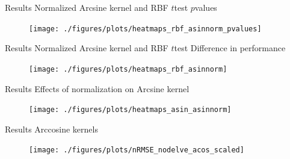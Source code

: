 \documentclass[aspectratio=169]{beamer}
\begin{document}
\begin{frame}{Results \textendash{} Normalized Arcsine kernel and RBF \textendash{} $t$\textendash{}test}
	\centering $p$\textendash{}values
	\begin{figure}[H]
		\texttt{[image: ./figures/plots/heatmaps\_rbf\_asinnorm\_pvalues]}
	\end{figure}
\end{frame}

\begin{frame}{Results \textendash{} Normalized Arcsine kernel and RBF \textendash{} $t$\textendash{}test}
	\centering Difference in performance
	\begin{figure}[H]
		\texttt{[image: ./figures/plots/heatmaps\_rbf\_asinnorm]}
	\end{figure}
\end{frame}


\begin{frame}{Results \textendash{} Effects of normalization on Arcsine kernel}
	\begin{figure}[H]
		\texttt{[image: ./figures/plots/heatmaps\_asin\_asinnorm]}
	\end{figure}
\end{frame}


\begin{frame}{Results \textendash{} Arccosine kernels}
	\begin{figure}[H]
		\texttt{[image: ./figures/plots/nRMSE\_nodelve\_acos\_scaled]}
	\end{figure}
\end{frame}
\end{document}
